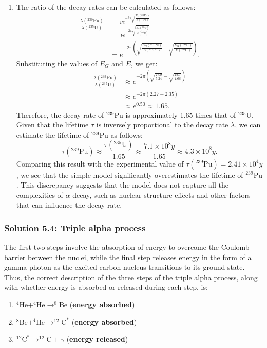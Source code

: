 \begin{enumerate}[label=(\alph*)]
    \item The ratio of the decay rates can be calculated as follows:
    \begin{align*}
    \frac{\lambda(^{239}\text{Pu})}{\lambda(^{235}\text{U})} &= \frac{\nu e^{-2\pi \sqrt{\frac{E_G(^{239}\text{Pu})}{E(^{239}\text{Pu})}}}}{\nu e^{-2\pi \sqrt{\frac{E_G(^{235}\text{U})}{E(^{235}\text{U})}}}} \\
    &= e^{-2\pi \left( \sqrt{\frac{E_G(^{239}\text{Pu})}{E(^{239}\text{Pu})}} - \sqrt{\frac{E_G(^{235}\text{U})}{E(^{235}\text{U})}} \right)}.
    \end{align*}
    Substituting the values of $E_G$ and $E$, we get:
    \begin{align*}
    \frac{\lambda(^{239}\text{Pu})}{\lambda(^{235}\text{U})} &\approx e^{-2\pi \left( \sqrt{\frac{27.0}{5.24}} - \sqrt{\frac{25.7}{4.68}} \right)} \\
    &\approx e^{-2\pi \left( 2.27 - 2.35 \right)} \\
    &\approx e^{0.50} \approx 1.65.
    \end{align*}
    Therefore, the decay rate of $^{239}\text{Pu}$ is approximately 1.65 times that of $^{235}\text{U}$. Given that the lifetime $\tau$ is inversely proportional to the decay rate $\lambda$, we can estimate the lifetime of $^{239}\text{Pu}$ as follows:
    \begin{equation}
    \tau(^{239}\text{Pu}) \approx \frac{\tau(^{235}\text{U})}{1.65} \approx \frac{7.1 \times 10^8 y}{1.65} \approx 4.3 \times 10^8 y.
    \end{equation}
    Comparing this result with the experimental value of $\tau(^{239}\text{Pu}) = 2.41 \times 10^4 y$, we see that the simple model significantly overestimates the lifetime of $^{239}\text{Pu}$. This discrepancy suggests that the model does not capture all the complexities of $\alpha$ decay, such as nuclear structure effects and other factors that can influence the decay rate.
\end{enumerate}
\subsubsection*{Solution 5.4: Triple alpha process}
The first two steps involve the absorption of energy to overcome the Coulomb barrier between the nuclei, while the final step releases energy in the form of a gamma photon as the excited carbon nucleus transitions to its ground state.
Thus, the correct description of the three steps of the triple alpha process, along with whether energy is absorbed or released during each step, is:
\begin{enumerate}[label=(\alph*)]
    \item $^4\text{He} + ^4\text{He} \to ^8\text{Be}$ (\textbf{energy absorbed})
    \item $^8\text{Be} + ^4\text{He} \to ^{12}\text{C}^*$ (\textbf{energy absorbed})
        \item $^{12}\text{C}^* \to ^{12}\text{C} + \gamma$ (\textbf{energy released})    
\end{enumerate}

